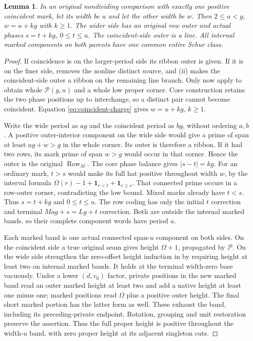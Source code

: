 \documentclass[11pt,a4paper]{amsart}
\numberwithin{equation}{section}
\theoremstyle{plain}
\newtheorem{lemma}[theorem]{Lemma}
\theoremstyle{definition}
\newcommand{\one}{\mathbf1}
\newcommand{\Row}{\operatorname{Row}}
\begin{document}
\begin{lemma}\label{lem:one-coincident-entry}
In an original nondividing comparison with exactly one positive
coincident mark, let its width be \(u\) and let the other width be \(w\).
Then \(2\le u<g\), \(w=u+kg\) with \(k\ge1\).  The wider side has an original
row outer and actual phases \(s=t+kg\), \(0\le t\le u\).  The coincident-side
outer is a line.  All internal marked components on both parents have one
common entire Schur class.
\end{lemma}
\begin{proof}
If coincidence is on the larger-period side its ribbon outer is given.
If it is on the finer side,  removes the
nonline distinct source, and (ii) makes the
coincident-side outer a ribbon on the remaining line branch.
Only now apply  to obtain whole \(\mathcal P(g,u)\) and
a whole low proper corner.  Core construction retains the two phase
positions up to interchange, so a distinct pair cannot become
coincident.  Equation \eqref{eq:coincident-charge} gives
\(w=u+kg\), \(k\ge1\).

Write the wide period as \(ag\) and the coincident period as \(bg\), without
ordering \(a,b\).  A positive outer-interior component on the wide side
would give a prime of span at least \(ag+w>g\) in the whole corner.
Its outer is therefore a ribbon.  If it had two rows, its mark prime of
span \(w>g\) would occur in that corner.  Hence the outer is the original
\(\Row_M\).  The core phase balance gives \(|s-t|=kg\).
For an ordinary mark, \(t>s\) would make its full hat positive throughout
width \(w\), by the interval formula
\(\Omega(r)-1+\one_{r<t}+\one_{r\ge s}\).  That connected prime occurs in
a row-outer corner, contradicting the low bound.  Mixed marks already
have \(t<s\).  Thus \(s=t+kg\) and \(0\le t\le u\).
The row coding has only the initial \(t\) correction and terminal
\(M ag+s=Lg+t\) correction.  Both are outside the internal marked bands,
so their complete component words have period \(a\).

Each marked band is one actual connected span-\(u\) component on both
sides.  On the coincident side a true original seam gives height
\(\Omega+1\), propagated by \(\mathcal P\).  On the wide side strengthen the zero-offset
height induction in  by requiring height at
least two on internal marked bands.  It holds at the terminal width-zero
base vacuously.  Under a lower \((d,v_0)\) factor, private positions in the
new marked band read an outer marked height at least two and add a native
height at least one minus one; marked positions read \(\Omega\) plus a
positive outer height.  The final short marked portion has the latter
form as well.  These exhaust the band, including its preceding-private
endpoint.  Rotation, grouping and unit restoration preserve the assertion.
Thus the full proper height is positive throughout the width-\(u\) band,
with zero proper height at its adjacent singleton cuts.


\end{proof}
\end{document}
